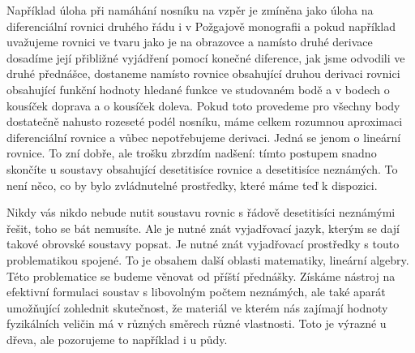 \documentclass[12pt]{article}
\begin{document}
Například úloha při namáhání nosníku na vzpěr je zmíněna jako úloha na diferenciální rovnici druhého řádu i v Požgajově monografii a pokud například uvažujeme rovnici ve tvaru jako je na obrazovce a namísto druhé derivace dosadíme její přibližné vyjádření pomocí konečné diference, jak jsme odvodili ve druhé přednášce, dostaneme namísto rovnice obsahující druhou derivaci rovnici obsahující funkční hodnoty hledané funkce ve studovaném bodě a v bodech o kousíček doprava a o kousíček doleva. Pokud toto provedeme pro všechny body dostatečně nahusto rozeseté podél nosníku, máme celkem rozumnou aproximaci diferenciální rovnice a vůbec nepotřebujeme derivaci. Jedná se jenom o lineární rovnice. To zní dobře, ale trošku zbrzdím nadšení: tímto postupem snadno skončíte u soustavy obsahující desetitisíce rovnice a desetitisíce neznámých. To není něco, co by bylo zvládnutelné prostředky, které máme teď k dispozici.

Nikdy vás nikdo nebude nutit soustavu rovnic s řádově desetitisíci neznámými řešit, toho se bát nemusíte. Ale je nutné znát vyjadřovací jazyk, kterým se dají takové obrovské soustavy popsat. Je nutné znát vyjadřovací prostředky s touto problematikou spojené. To je obsahem další oblasti matematiky, lineární algebry. Této problematice se budeme věnovat od příští přednášky. Získáme nástroj na efektivní formulaci soustav s libovolným počtem neznámých, ale také aparát umožňující zohlednit skutečnost, že materiál ve kterém nás zajímají hodnoty fyzikálních veličin má v různých směrech různé vlastnosti. Toto je výrazné u dřeva, ale pozorujeme to například i u půdy. 
\end{document}
